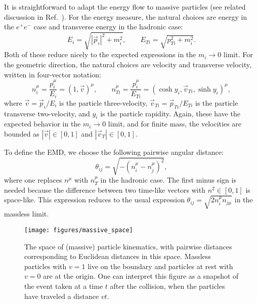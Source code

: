 \documentclass[letterpaper,11pt]{article}
\DeclareRobustCommand{\Ref}[1]{Ref.~\cite{#1}}
\begin{document}
It is straightforward to adapt the energy flow to massive particles (see related discussion in \Ref{Mateu:2012nk}).
%
For the energy measure, the natural choices are energy in the $e^+e^-$ case and transverse energy in the hadronic case:
%
\begin{equation}
%
E_i = \sqrt{|\vec p_i|^2+m_i^2}, \qquad
E_{Ti}=\sqrt{p_{Ti}^2+m_i^2}.
%
\end{equation}
%
Both of these reduce nicely to the expected expressions in the $m_i\to0$ limit.
%
For the geometric direction, the natural choices are velocity and transverse velocity, written in four-vector notation:
%
\begin{equation}
%
n^\mu_i = \frac{p_i^\mu}{E_i} = (1,\vec{v})^\mu, \qquad
n^\mu_{Ti} = \frac{p_i^\mu}{E_{Ti}} = (\cosh y_i, \vec{v}_{Ti}, \sinh y_i)^\mu,
%
\end{equation}
%
where $\vec{v} = \vec{p}_i / E_i$ is the particle three-velocity, $\vec{v}_{Ti} = \vec{p}_{Ti} / E_{Ti}$ is the particle transverse two-velocity, and $y_i$ is the particle rapidity.
%
Again, these have the expected behavior in the $m_i\to0$ limit, and for finite mass, the velocities are bounded as $|\vec{v}| \in [0,1]$ and $|\vec{v}_T| \in [0,1]$.


To define the EMD, we choose the following pairwise angular distance:
%
\begin{equation}
\label{eq:theta_massive}
%
\theta_{ij}=\sqrt{ - (n_i^\mu-n_j^\mu)^2},
%
\end{equation}
%
where one replaces $n^\mu$ with $n_T^\mu$ in the hadronic case.
%
The first minus sign is needed because the difference between two time-like vectors with $n^2 \in [0,1]$ is space-like.
%
This expression reduces to the usual expression $\theta_{ij}=\sqrt{2n_i^\mu n_{j\mu}}$ in the massless limit.

\begin{figure}[t]
\centering
\texttt{[image: figures/massive\_space]}
\caption{\label{fig:sphere} The space of (massive) particle kinematics, with pairwise distances corresponding to Euclidean distances in this space.
%
Massless particles with $v=1$ live on the boundary and particles at rest with $v=0$ are at the origin.
%
One can interpret this figure as a snapshot of the event taken at a time $t$ after the collision, when the particles have traveled a distance $v t$.
}
\end{figure}
\end{document}
